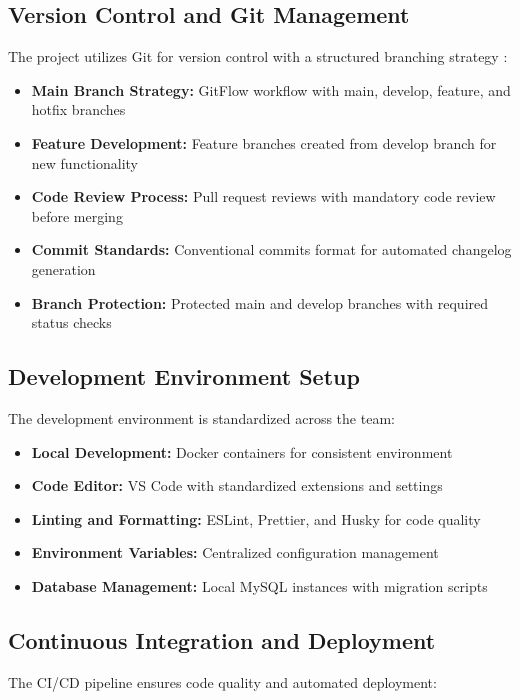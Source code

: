 \documentclass[conference]{IEEEtran}
\begin{document}
\subsection{Version Control and Git Management}
The project utilizes Git for version control with a structured branching strategy \cite{devops_practices}:

\begin{itemize}
    \item \textbf{Main Branch Strategy:} GitFlow workflow with main, develop, feature, and hotfix branches
    \item \textbf{Feature Development:} Feature branches created from develop branch for new functionality
    \item \textbf{Code Review Process:} Pull request reviews with mandatory code review before merging
    \item \textbf{Commit Standards:} Conventional commits format for automated changelog generation
    \item \textbf{Branch Protection:} Protected main and develop branches with required status checks
\end{itemize}

\subsection{Development Environment Setup}
The development environment is standardized across the team:

\begin{itemize}
    \item \textbf{Local Development:} Docker containers for consistent environment
    \item \textbf{Code Editor:} VS Code with standardized extensions and settings
    \item \textbf{Linting and Formatting:} ESLint, Prettier, and Husky for code quality
    \item \textbf{Environment Variables:} Centralized configuration management
    \item \textbf{Database Management:} Local MySQL instances with migration scripts
\end{itemize}


\subsection{Continuous Integration and Deployment}
The CI/CD pipeline ensures code quality and automated deployment:
\end{document}
